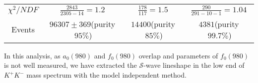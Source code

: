 {\begin{table}[htbp]
\begin{center}
\begin{tabular}{cccc}
                $\chi^{2}/NDF$                                                  & $\frac{2843}{2305-14}=1.2$ & $\frac{178}{117}=1.5$ & $\frac{290}{291-10-1}=1.04$\\
                Events                                                         &$96307\pm369$(purity$\ 95\%$)          &$14400$(purity$\ 85\%$)  &$4381$(purity$\ 99.7\%$)\\
                \bottomrule\bottomrule
            \end{tabular}
        \end{center}
    \end{table}

    In this analysis, as $a_{0}(980)$ and $f_{0}(980)$ overlap and parameters of $f_{0}(980)$ is not well measured, 
    we have extracted the $\mathcal{S}$-wave lineshape in the low end of $K^{+}K^{-}$ mass spectrum with the model independent method.
    
}
